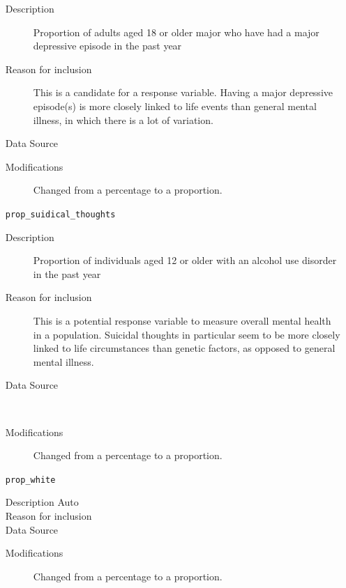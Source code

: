 \documentclass{article}
\begin{document}
\begin{itemize}[label={}, align=left]
          \begin{description}
              \item[Description] Proportion of adults aged 18 or older major
                    who have had a major depressive episode in the past year
              \item[Reason for inclusion] This is a candidate for a response
                    variable. Having a major depressive episode(s) is more
                    closely linked to life events than general mental illness, in
                    which there is a lot of variation.
              \item[Data Source] \cite{samhsa_data}
              \item[Modifications] Changed from a percentage to a proportion.
          \end{description}
    \item[\texttt{prop\_suidical\_thoughts}] \
          \begin{description}
              \item[Description] Proportion of individuals aged 12 or older
                    with an alcohol use disorder in the past year \\
              \item[Reason for inclusion] This is a potential response variable
                    to measure overall mental health in a population. Suicidal
                    thoughts in particular seem to be more closely linked to life
                    circumstances than genetic factors, as opposed to general
                    mental illness.
              \item[Data Source] \cite{samhsa_data} \\
              \item[Modifications] Changed from a percentage to a proportion.
          \end{description}
    \item[\texttt{prop\_white}] \
          \begin{description}
              \item[Description Auto] 
              \item[Reason for inclusion] \descentreason
              \item[Data Source] \cite{acs_demographics_data}
              \item[Modifications] Changed from a percentage to a proportion.
          \end{description}

\end{itemize}
\end{document}
